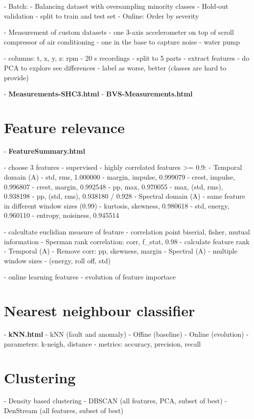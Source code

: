 	- Batch: 
		- Balancing dataset with oversampling minority classes	
		- Hold-out validation - split to train and test set
	- Online: Order by severity

- Measurement of custom datasets 
	- one 3-axis accelerometer on top of scroll compressor of air conditioning
		- one in the base to capture noise
	- water pump
	
	- columns: t, x, y, z: rpm
	- 20 s recordings - split to 5 parts - extract features
	- do PCA to explore see differences
	- label as worse, better (classes are hard to provide)

- \textbf{Measurements-SHC3.html}
- \textbf{BVS-Measurements.html}

\section{Feature relevance}
- \textbf{FeatureSummary.html}

- choose 3 features
- supervised
	- highly correlated features >= 0.9:
		- Temporal domain (A)
			- std, rms, 1.000000
			- margin, impulse, 0.999079
			- crest, impulse, 0.996807
			- crest, margin,	0.992548
			- pp, max, 0.970055
			- max, (std, rms), 0.938198
			- pp, (std, rms), 0.938180 / 0.928
		- Spectral domain (A)
			- same feature in different window sizes (0.99)
			- kurtosis, skewness, 0.980618
			- std, energy, 0.960110
			- entropy, noisiness, 0.945514

	- calcultate euclidian measure of feature 
	- correlation point biserial, fisher, mutual information
		- Sperman rank correlation: corr, f\_stat, 0.98
	- calculate feature rank
		- Temporal (A) - Remove corr: pp, skewness, margin
		- Spectral (A) - multiple window sizes 
			- (energy, roll off, std) 

- online learning features
	- evolution of feature importace

\section{Nearest neighbour classifier}
- \textbf{kNN.html}
- kNN (fault and anomaly)
	- Offine (baseline)
	- Online (evolution)
- parameters: k-neigh, distance
- metrics: accuracy, precision, recall

\section{Clustering}
- Density based clustering
	- DBSCAN (all features, PCA, subset of best)
	- DenStream (all features, subset of best)

